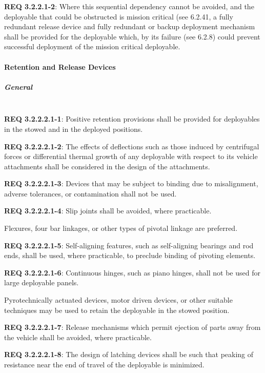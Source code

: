 \documentclass[12pt]{article}
\begin{document}
\noindent \textbf{REQ 3.2.2.1-2}: Where this sequential dependency cannot be avoided, and the deployable that could be obstructed is mission critical (see 6.2.41, a fully redundant release device and fully redundant or backup deployment mechanism shall be provided for the deployable which, by its failure (see 6.2.8) could prevent successful deployment of the mission critical deployable.


\paragraph{Retention and Release Devices} %
\subparagraph{General} \mbox{} \\ %
\noindent \textbf{REQ 3.2.2.2.1-1}: Positive retention provisions shall be provided for deployables in the stowed and in the deployed positions. 

\noindent \textbf{REQ 3.2.2.2.1-2}: The effects of deflections such as those induced by centrifugal forces or differential thermal growth of any deployable with respect to its vehicle attachments shall be considered in the design of the attachments. 

\noindent \textbf{REQ 3.2.2.2.1-3}: Devices that may be subject to binding due to misalignment, adverse tolerances, or contamination shall not be used. 

\noindent \textbf{REQ 3.2.2.2.1-4}: Slip joints shall be avoided, where practicable. 

Flexures, four bar linkages, or other types of pivotal linkage are preferred.

\noindent \textbf{REQ 3.2.2.2.1-5}: Self-aligning features, such as self-aligning bearings and rod ends, shall be used, where practicable, to preclude binding of pivoting elements. 

\noindent \textbf{REQ 3.2.2.2.1-6}: Continuous hinges, such as piano hinges, shall not be used for large deployable panels. 

Pyrotechnically actuated devices, motor driven devices, or other suitable techniques may be used to retain the deployable in the stowed position. 

\noindent \textbf{REQ 3.2.2.2.1-7}: Release mechanisms which permit ejection of parts away from the vehicle shall be avoided, where practicable. 

\noindent \textbf{REQ 3.2.2.2.1-8}: The design of latching devices shall be such that peaking of resistance near the end of travel of the deployable is minimized. 
\end{document}
